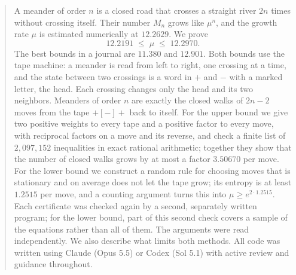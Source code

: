 \begin{abstract}
A meander of order $n$ is a closed road that crosses a straight river $2n$ times without crossing itself. Their number
$M_n$ grows like $\mu^n$, and the growth rate $\mu$ is estimated numerically at $12.2629$. We prove
\[ 12.2191 \;\le\; \mu \;\le\; 12.2970 . \]
The best bounds in a journal are $11.380$ and $12.901$. Both bounds use the tape machine: a meander is read from left
to right, one crossing at a time, and the state between two crossings is a word in $+$ and $-$ with a marked letter,
the head. Each crossing changes only the head and its two neighbors. Meanders of order $n$ are exactly the closed
walks of $2n-2$ moves from the tape $+[-]+$ back to itself. For the upper bound we give two positive weights to every
tape and a positive factor to every move, with reciprocal factors on a move and its reverse, and check a finite list of
$2{,}097{,}152$ inequalities in exact rational arithmetic; together they show that the number of closed walks grows
by at most a factor $3.50670$ per move. For the lower bound we construct a random rule for choosing moves that is stationary
and on average does not let the tape grow; its entropy is at least $1.2515$ per move, and a counting argument turns
this into $\mu\ge e^{2\cdot 1.2515}$. Each certificate was checked again by
a second, separately written program; for the lower bound, part of this second check covers a sample of the
equations rather than all of them. The arguments were read independently. We also describe what limits both
methods. All code was written using Claude (Opus 5.5) or Codex (Sol 5.1) with active review and guidance throughout.
\end{abstract}
